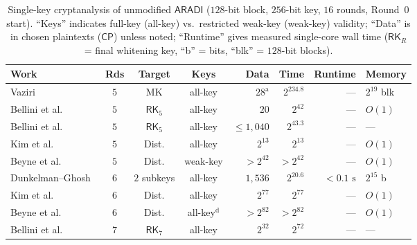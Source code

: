 \documentclass[11pt,a4paper]{article}
\theoremstyle{definition}
\theoremstyle{remark}
\newcommand{\ARADI}{\mathsf{ARADI}}
\newcommand{\CP}{\mathsf{CP}}
\begin{document}
\begin{table}[t!]
\centering
\caption{Single-key cryptanalysis of unmodified $\ARADI$ ($128$-bit block, $256$-bit key, $16$ rounds, Round~$0$ start). ``Keys'' indicates full-key (all-key) vs.\ restricted weak-key (weak-key) validity; ``Data'' is in chosen plaintexts ($\CP$) unless noted; ``Runtime'' gives measured single-core wall time ($\mathsf{RK}_R$ = final whitening key, ``b'' = bits, ``blk'' = $128$-bit blocks).}
\label{tab:comparison}
\footnotesize
\setlength{\tabcolsep}{5.2pt}
\renewcommand{\arraystretch}{1.02}
\begin{tabular}{@{}lcccrrrl@{}}
\toprule
\textbf{Work} & \textbf{Rds} & \textbf{Target} & \textbf{Keys} & \textbf{Data} & \textbf{Time} & \textbf{Runtime} & \textbf{Memory} \\
\midrule
Vaziri~\cite{Vaz25}                 & $5$           & MK           & all-key  & $28^{\mathrm{a}}$        & $2^{234.8}$                & ---           & $2^{19}$ blk \\
Bellini et al.~\cite{BBGHP25}       & $5$           & $\mathsf{RK}_5$ & all-key  & $20$                     & $2^{42}$                   & ---           & $O(1)$ \\
Bellini et al.~\cite{BBGHP25}       & $5$           & $\mathsf{RK}_5$ & all-key  & $\le 1{,}040$            & $2^{43.3}$                 & ---           & --- \\
Kim et al.~\cite{KKL24}             & $5$           & Dist.        & all-key  & $2^{13}$                 & $2^{13}$                   & ---           & $O(1)$ \\
Beyne et al.~\cite{BNS26}           & $5$           & Dist.        & weak-key & $>2^{42}$                & $>2^{42}$                  & ---           & $O(1)$ \\
Dunkelman--Ghosh~\cite{DG25}        & $6$           & $2$ subkeys  & all-key  & $1{,}536$                & $2^{20.6}$                 & $<0.1\text{ s}$ & $2^{15}$ b \\
Kim et al.~\cite{KKL24}             & $6$           & Dist.        & all-key  & $2^{77}$                 & $2^{77}$                   & ---           & $O(1)$ \\
Beyne et al.~\cite{BNS26}           & $6$           & Dist.        & all-key$^{\mathrm{d}}$ & $>2^{82}$          & $>2^{82}$                  & ---           & $O(1)$ \\
Bellini et al.~\cite{BBGHP25}       & $7$           & $\mathsf{RK}_7$ & all-key  & $2^{32}$                 & $2^{72}$                   & ---           & --- \\

\end{tabular}
\end{table}
\end{document}

